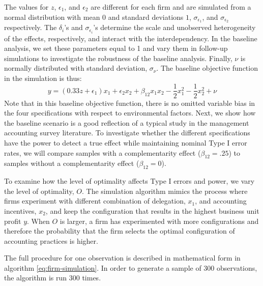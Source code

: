 \documentclass[12pt]{article}
\begin{document}
The values for $z$, $\epsilon_1$, and $\epsilon_2$ are different for each firm and are simulated from a normal distribution with mean $0$ and standard deviations $1$,  $\sigma_{\epsilon_1}$, and $\sigma_{\epsilon_2}$ respectively. The $\delta_i$'s and $\sigma_{\epsilon_i}$'s determine the scale and unobserved heterogeneity of the effects, respectively, and interact with the interdependency. In the baseline analysis, we set these parameters equal to 1 and vary them in follow-up simulations to investigate the robustness of the baseline analysis. Finally, $\nu$ is normally distributed with standard deviation, $\sigma_{\nu}$. The baseline objective function in the simulation is thus:
\begin{equation}\label{eq:baseline}
y  = (0.33 z + \epsilon_1) x_1 
						+ \epsilon_2 x_2 
                        + \beta_{12} x_1 x_2 
                        - \frac{1}{2}x^2_1 - \frac{1}{2}x^2_2 + \nu
\end{equation}
Note that in this baseline objective function, there is no omitted variable bias in the four specifications with respect to environmental factors. Next, we show how the baseline scenario is a good reflection of a typical study in the management accounting survey literature. To investigate whether the different specifications have the power to detect a true effect while maintaining nominal Type I error rates, we will compare samples with a complementarity effect ($\beta_{12} = .25$) to samples without a complementarity effect ($\beta_{12} = 0$).

To examine how the level of optimality affects Type I errors and power, we vary the level of optimality, $O$. The simulation algorithm mimics the process where firms experiment with different combination of delegation, $x_1$, and accounting incentives, $x_2$, and keep the configuration that results in the highest business unit profit $y$. When $O$ is larger, a firm has experimented with more configurations and therefore the probability that the firm selects the optimal configuration of accounting practices is higher.

The full procedure for one observation is described in mathematical form in algorithm \eqref{eq:firm-simulation}. In order to generate a sample of $300$ observations, the algorithm is run $300$ times.
\end{document}
